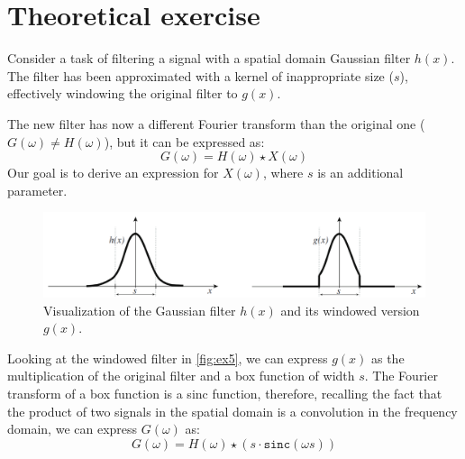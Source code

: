 \documentclass[tikz,14pt,fleqn]{article}
\begin{document}
\section{Theoretical exercise}
Consider a task of filtering a signal with a spatial domain Gaussian filter $h(x)$. 
The filter has been approximated with a kernel of inappropriate size ($s$), effectively windowing the original filter to $g(x)$.

The new filter has now a different Fourier transform than the original one ($G(\omega) \neq H(\omega)$), but it can be expressed as:
\begin{equation*}
    G(\omega) = H(\omega) \star X(\omega)
\end{equation*}
Our goal is to derive an expression for $X(\omega)$, where $s$ is an additional parameter.

\begin{figure}[H]
    \centering
    \includegraphics[width=0.8\linewidth]{fig/5.hx-gx.png}
    \caption{Visualization of the Gaussian filter $h(x)$ and its windowed version $g(x)$.}
    \label{fig:ex5}
\end{figure}

Looking at the windowed filter in \autoref{fig:ex5}, we can express $g(x)$ as the multiplication of the original filter and a box function of width $s$. The Fourier transform of a box function is a sinc function, therefore, recalling the fact that the product of two signals in the spatial domain is a convolution in the frequency domain, we can express $G(\omega)$ as:
\begin{equation*}
    G(\omega) = H(\omega) \star (s\cdot\texttt{sinc}(\omega s))
\end{equation*}
\end{document}
